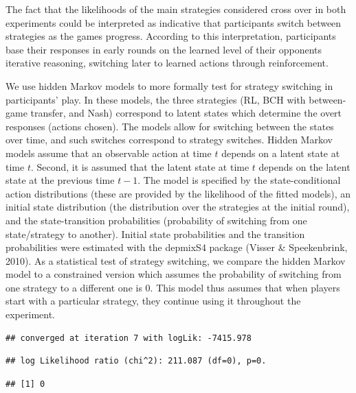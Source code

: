 \documentclass[
  english,
  man,floatsintext]{apa6}
\begin{document}
The fact that the likelihoods of the main strategies considered cross over in both experiments could be interpreted as indicative that participants switch between strategies as the games progress. According to this interpretation, participants base their responses in early rounds on the learned level of their opponents iterative reasoning, switching later to learned actions through reinforcement.

We use hidden Markov models to more formally test for strategy switching in participants' play. In these models, the three strategies (RL, BCH with between-game transfer, and Nash) correspond to latent states which determine the overt responses (actions chosen). The models allow for switching between the states over time, and such switches correspond to strategy switches. Hidden Markov models assume that an observable action at time \(t\) depends on a latent state at time \(t\). Second, it is assumed that the latent state at time \(t\) depends on the latent state at the previous time \(t-1\). The model is specified by the state-conditional action distributions (these are provided by the likelihood of the fitted models), an initial state distribution (the distribution over the strategies at the initial round), and the state-transition probabilities (probability of switching from one state/strategy to another). Initial state probabilities and the transition probabilities were estimated with the depmixS4 package (Visser \& Speekenbrink, 2010). As a statistical test of strategy switching, we compare the hidden Markov model to a constrained version which assumes the probability of switching from one strategy to a different one is 0. This model thus assumes that when players start with a particular strategy, they continue using it throughout the experiment.

\begin{verbatim}
## converged at iteration 7 with logLik: -7415.978
\end{verbatim}

\begin{verbatim}
## log Likelihood ratio (chi^2): 211.087 (df=0), p=0.
\end{verbatim}

\begin{verbatim}
## [1] 0
\end{verbatim}
\end{document}
